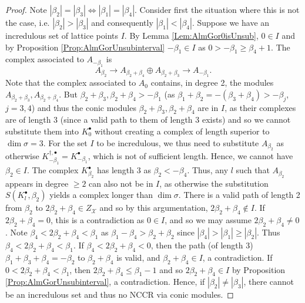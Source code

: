 \documentclass[reqno, 12pt]{amsart}
\theoremstyle{definition}
\numberwithin{equation}{section}
\begin{document}
\begin{proof}
Note $|\beta_2|=|\beta_3|\Leftrightarrow |\beta_1|=|\beta_4|$. Consider first the situation where this is not the case, i.e. $|\beta_2|>|\beta_3|$ and consequently $|\beta_1|<|\beta_4|$. Suppose we have an incredulous set of lattice points $I$. By Lemma \ref{Lem:AlmGor0isUnsub}, $0\in I$ and by Proposition \ref{Prop:AlmGorUnsubinterval} $-\beta_1\in I$ as $0>-\beta_1\ge \beta_4+1$.
The complex associated to $A_{-\beta_1}$ is \[
A_{\beta_2}\rightarrow A_{\beta_2+\beta_4}\oplus A_{\beta_2+\beta_3}\rightarrow A_{-\beta_1}. \]
Note that the complex associated to $A_0$ contains, in degree 2, the modules $A_{\beta_2+\beta_3}, A_{\beta_2+\beta_4}$. 
But $\beta_2+\beta_3,\beta_2+\beta_4>-\beta_1$ (as $\beta_1+\beta_2=-(\beta_3+\beta_4)>-\beta_j$, $j=3,4$) and thus the conic modules $\beta_2+\beta_3, \beta_2+\beta_4$  are in $I$, as their complexes are of length 3 (since a valid path to them of length 3 exists) and so we cannot substitute them into $K_0^\bullet$ without creating a complex of length superior to $\dim \sigma=3$. For the set $I$ to be incredulous, we thus need to substitute $A_{\beta_2}$ as otherwise $K_{-\beta_1}^{\dagger,\bullet}=K_{-\beta_1}^\bullet$, which is not of sufficient length. Hence, we cannot have $\beta_2\in I$. The complex $K_{\beta_2}^\bullet$ has length 3 as $\beta_2<-\beta_4$. Thus, any $l$ such that $A_{\beta_2}$ appears in degree $\ge 2$ can also not be in $I$, as otherwise the substitution $S(K_l^\bullet,\beta_2)$ yields a complex longer than $\dim \sigma$. There is a valid path of length 2 from $\beta_2$ to $2\beta_2+\beta_4\in Z_\mathcal{X}$ and so by this argumentation, $2\beta_2+\beta_4\not \in I$. If $2\beta_2+\beta_4=0$, this is a contradiction as $0\in I$, and so we may assume $2\beta_2+\beta_4\neq 0$.  Note $\beta_4<2\beta_2+\beta_4<\beta_1$ as $\beta_1-\beta_4>\beta_2+\beta_2$ since $|\beta_4|>|\beta_1|\ge|\beta_2|$. Thus $\beta_4<2\beta_2+\beta_4<\beta_1$. If $\beta_4<2\beta_2+\beta_4<0$, then the path (of length 3) $\beta_1+\beta_3+\beta_4=-\beta_2$ to $\beta_2+\beta_4$ is valid, and $\beta_2+\beta_4\in I$, a contradiction. If $0<2\beta_2+\beta_4<\beta_1$, then $2\beta_2+\beta_4\le \beta_1-1$ and so $2\beta_2+\beta_4\in I$ by Proposition \ref{Prop:AlmGorUnsubinterval}, a contradiction. Hence, if $|\beta_2|\neq |\beta_3|$, there cannot be an incredulous set and thus no NCCR via conic modules. 


\end{proof}
\end{document}
